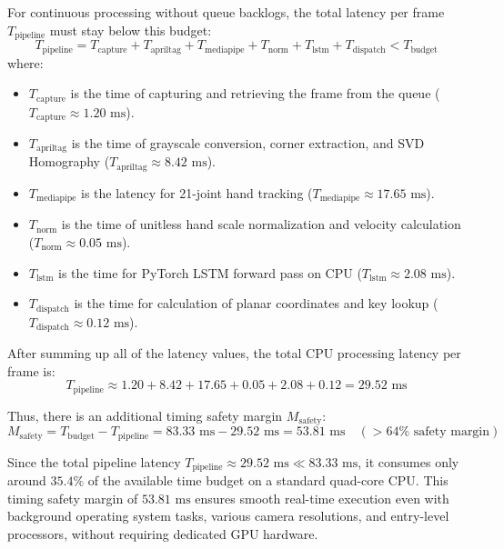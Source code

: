 For continuous processing without queue backlogs, the total latency per frame $T_{\text{pipeline}}$ must stay below this budget:
\begin{equation}
T_{\text{pipeline}} = T_{\text{capture}} + T_{\text{apriltag}} + T_{\text{mediapipe}} + T_{\text{norm}} + T_{\text{lstm}} + T_{\text{dispatch}} < T_{\text{budget}}
\label{eq:latency_inequality}
\end{equation}
where:
\begin{itemize}
    \item $T_{\text{capture}}$ is the time of capturing and retrieving the frame from the queue ($T_{\text{capture}} \approx 1.20\text{ ms}$).
    \item $T_{\text{apriltag}}$ is the time of grayscale conversion, corner extraction, and SVD Homography ($T_{\text{apriltag}} \approx 8.42\text{ ms}$).
    \item $T_{\text{mediapipe}}$ is the latency for 21-joint hand tracking ($T_{\text{mediapipe}} \approx 17.65\text{ ms}$).
    \item $T_{\text{norm}}$ is the time of unitless hand scale normalization and velocity calculation ($T_{\text{norm}} \approx 0.05\text{ ms}$).
    \item $T_{\text{lstm}}$ is the time for PyTorch LSTM forward pass on CPU ($T_{\text{lstm}} \approx 2.08\text{ ms}$).
    \item $T_{\text{dispatch}}$ is the time for calculation of planar coordinates and key lookup ($T_{\text{dispatch}} \approx 0.12\text{ ms}$).
\end{itemize}

After summing up all of the latency values, the total CPU processing latency per frame is:
\begin{equation}
T_{\text{pipeline}} \approx 1.20 + 8.42 + 17.65 + 0.05 + 2.08 + 0.12 = 29.52\text{ ms}
\label{eq:total_pipeline_latency}
\end{equation}

Thus, there is an additional timing safety margin $M_{\text{safety}}$:
\begin{equation}
M_{\text{safety}} = T_{\text{budget}} - T_{\text{pipeline}} = 83.33\text{ ms} - 29.52\text{ ms} = 53.81\text{ ms} \quad (> 64\% \text{ safety margin})
\label{eq:safety_margin}
\end{equation}

Since the total pipeline latency $T_{\text{pipeline}} \approx 29.52\text{ ms} \ll 83.33\text{ ms}$, it consumes only around $35.4\%$ of the available time budget on a standard quad-core CPU. This timing safety margin of $53.81\text{ ms}$ ensures smooth real-time execution even with background operating system tasks, various camera resolutions, and entry-level processors, without requiring dedicated GPU hardware.

